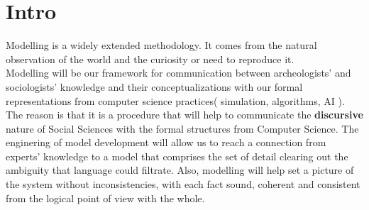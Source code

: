 \documentclass[11pt,oneside,a4paper,openright]{report}
\begin{document}
\section{Intro}




Modelling is a widely extended methodology. It comes from the natural observation of the world and the curiosity or need to reproduce it.\\



Modelling will be our framework for communication between archeologists' and sociologists' knowledge and their conceptualizations with our formal representations from computer science practices( simulation, algorithms, AI ).
The reason is that it is a procedure that will help to communicate the \textbf{discursive} nature of Social Sciences with the formal structures from Computer Science. The enginering of model development will allow us to reach a connection from experts' knowledge to a model that comprises the set of detail clearing out the ambiguity that language could filtrate. Also, modelling will help set a picture of the system without inconsistencies, with each fact sound, coherent and consistent from the logical point of view with the whole.\\ 
\end{document}
